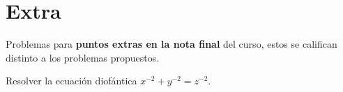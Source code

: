 \section{Extra}
Problemas para \textbf{puntos extras en la nota final} del curso, estos se califican distinto a los problemas propuestos.

\begin{problem}
    Resolver la ecuación diofántica $x^{-2} + y^{-2} = z^{-2}.$
\end{problem}